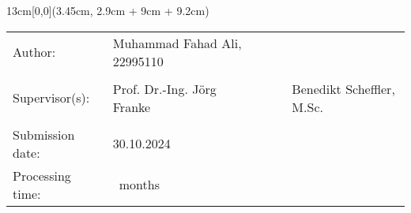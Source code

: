 \begin{textblock*}{13cm}[0,0](3.45cm, 2.9cm + 9cm + 9.2cm)
\singlespacing
\begin{table}[h!]
	\begin{tabular}{p{3.5cm}p{7cm}R{4.2cm}}
		Author: 	&	Muhammad Fahad Ali, 22995110\\
		& & \\
		Supervisor(s):		&	Prof. Dr.-Ing. Jörg Franke
            & &
                              &  Benedikt Scheffler, M.Sc.	& \\ 
		& & \\
                                    
		Submission date: 	&	30.10.2024 				& \\
		Processing time:	&	\BEARBEITUNGSZEIT\ months &
	\end{tabular}
\end{table}
\end{textblock*}

\mbox{ }

\newpage
\thispagestyle{empty}



